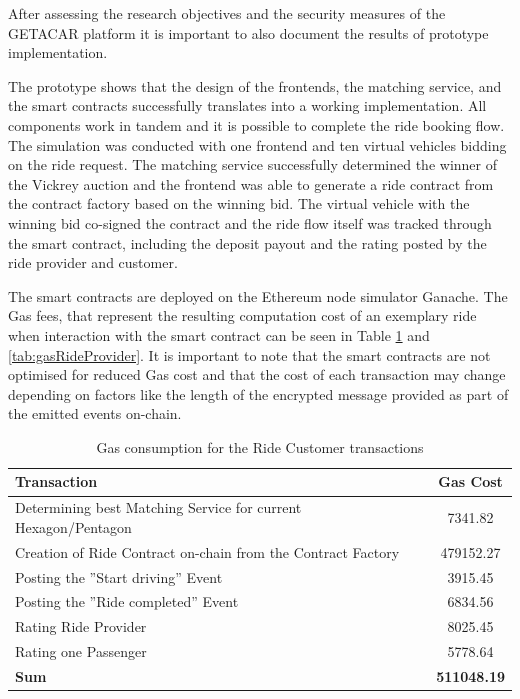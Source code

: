 After assessing  the research objectives and the security measures of the GETACAR platform it is important to also document the results of prototype implementation. 

The prototype shows that the design of the frontends, the matching service, and the smart contracts successfully translates into a working implementation. All components work in tandem and it is possible to complete the ride booking flow. The simulation was conducted with one frontend and ten virtual vehicles bidding on the ride request. The matching service successfully determined the winner of the Vickrey auction and the frontend was able to generate a ride contract from the contract factory based on the winning bid. The virtual vehicle with the winning bid co-signed the contract and the ride flow itself was tracked through the smart contract, including the deposit payout and the rating posted by the ride provider and customer.

The smart contracts are deployed on the Ethereum node simulator Ganache. The Gas fees, that represent the resulting computation cost of an exemplary ride when interaction with the smart contract can be seen in Table \ref{tab:gasCustomer} and \ref{tab:gasRideProvider}. It is important to note that the smart contracts are not optimised for reduced Gas cost and that the cost of each transaction may change depending on factors like the length of the encrypted message provided as part of the emitted events on-chain.

\begin{table}[H]
\centering
\begin{tabular}{|l|c|}
\hline
\textbf{Transaction} & \textbf{Gas Cost} \\
\hline
Determining best Matching Service for current Hexagon/Pentagon & 7341.82 \\
\hline
Creation of Ride Contract on-chain from the Contract Factory& 479152.27 \\
\hline
Posting the ''Start driving'' Event& 3915.45 \\
\hline
Posting the ''Ride completed'' Event & 6834.56 \\
\hline
Rating Ride Provider & 8025.45 \\
\hline
Rating one Passenger & 5778.64 \\
\hline
\hline
\textbf{Sum}  & \textbf{511048.19} \\
\hline
\end{tabular}
\caption{Gas consumption for the Ride Customer transactions}
\label{tab:gasCustomer}
\end{table}


